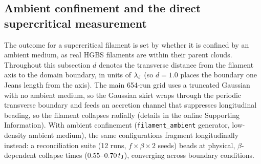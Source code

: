 \documentclass[usenatbib,twoside,twocolumn]{mnras}
\begin{document}
\subsection{Ambient confinement and the direct supercritical measurement}
\label{sec:modecompetition}

The outcome for a supercritical filament is set by whether it is confined by an ambient medium, as real HGBS filaments are within their parent clouds. Throughout this subsection $d$ denotes the transverse distance from the filament axis to the domain boundary, in units of $\lambda_{\rm J}$ (so $d=1.0$ places the boundary one Jeans length from the axis). The main 654-run grid uses a truncated Gaussian with no ambient medium, so the Gaussian skirt wraps through the periodic transverse boundary and feeds an accretion channel that suppresses longitudinal beading, so the filament collapses radially (details in the online Supporting Information). With ambient confinement (\texttt{filament\_ambient} generator, low-density ambient medium), the same configurations fragment longitudinally instead: a reconciliation suite (12 runs, $f\times\beta\times2$ seeds) beads at physical, $\beta$-dependent collapse times ($0.55$--$0.70\,t_{\rm J}$), converging across boundary conditions.
\end{document}

